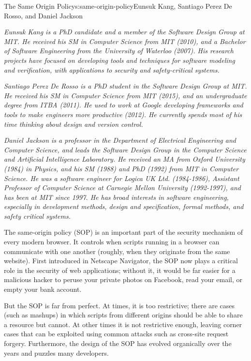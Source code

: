 \begin{aosachapter}{The Same Origin Policy}{s:same-origin-policy}{Eunsuk Kang, Santiago Perez De Rosso, and Daniel Jackson}

\emph{Eunsuk Kang is a PhD candidate and a member of the Software Design
Group at MIT. He received his SM in Computer Science from MIT (2010),
and a Bachelor of Software Engineering from the University of Waterloo
(2007). His research projects have focused on developing tools and
techniques for software modeling and verification, with applications to
security and safety-critical systems.}

\emph{Santiago Perez De Rosso is a PhD student in the Software Design
Group at MIT. He received his SM in Computer Science from MIT (2015),
and an undergraduate degree from ITBA (2011). He used to work at Google
developing frameworks and tools to make engineers more productive
(2012). He currently spends most of his time thinking about design and
version control.}

\emph{Daniel Jackson is a professor in the Department of Electrical
Engineering and Computer Science, and leads the Software Design Group in
the Computer Science and Artificial Intelligence Laboratory. He received
an MA from Oxford University (1984) in Physics, and his SM (1988) and
PhD (1992) from MIT in Computer Science. He was a software engineer for
Logica UK Ltd. (1984-1986), Assistant Professor of Computer Science at
Carnegie Mellon University (1992-1997), and has been at MIT since 1997.
He has broad interests in software engineering, especially in
development methods, design and specification, formal methods, and
safety critical systems.}

\label{introduction}

The same-origin policy (SOP) is an important part of the security
mechanism of every modern browser. It controls when scripts running in a
browser can communicate with one another (roughly, when they originate
from the same website). First introduced in Netscape Navigator, the SOP
now plays a critical role in the security of web applications; without
it, it would be far easier for a malicious hacker to peruse your private
photos on Facebook, read your email, or empty your bank account.

But the SOP is far from perfect. At times, it is too restrictive; there
are cases (such as mashups) in which scripts from different origins
should be able to share a resource but cannot. At other times it is not
restrictive enough, leaving corner cases that can be exploited using
common attacks such as cross-site request forgery. Furthermore, the
design of the SOP has evolved organically over the years and puzzles
many developers.


\end{aosachapter}
